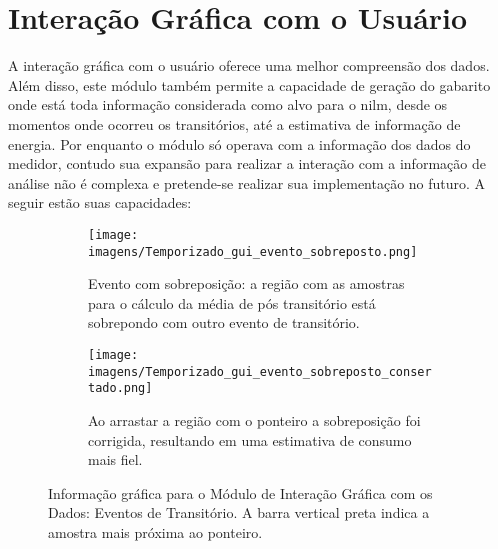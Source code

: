 \section{Interação Gráfica com o Usuário}
\label{sec:gui}

A interação gráfica com o usuário oferece uma melhor compreensão dos
dados. Além disso, este módulo também permite a capacidade de geração
do gabarito onde está toda informação considerada como alvo para o
\gls{nilm}, desde os momentos onde ocorreu os transitórios, até a
estimativa de informação de energia. Por enquanto o módulo só operava
com a informação dos dados do medidor, contudo sua expansão para
realizar a interação com a informação de análise não é complexa e
pretende-se realizar sua implementação no futuro. A seguir estão
suas capacidades:

\begin{figure*}[p]
  \begin{center}
    \begin{subfigure}[c]{\textwidth}
      \texttt{[image: imagens/Temporizado\_gui\_evento\_sobreposto.png]}
      \caption{Evento com sobreposição: a região com as amostras para o cálculo da
média de pós transitório está sobrepondo com outro evento de
transitório.}
      \label{fig:gui_evento_sobreposto}
    \end{subfigure}
    \hfill
    \begin{subfigure}[c]{\textwidth}
      \texttt{[image: imagens/Temporizado\_gui\_evento\_sobreposto\_consertado.png]}
      \caption{Ao arrastar a região com o ponteiro a sobreposição foi
corrigida, resultando em uma estimativa de consumo mais fiel.}
      \label{fig:gui_evento_sobreposto_corrigido}
    \end{subfigure}
  \end{center}
\caption[Informação gráfica para o Módulo de Interação Gráfica com os
Dados: Eventos de Transitório.]{Informação gráfica para o Módulo de Interação Gráfica com os
Dados: Eventos de Transitório. A barra vertical preta indica a amostra
mais próxima ao ponteiro. }
\label{fig:gui_evento}
\end{figure*}

